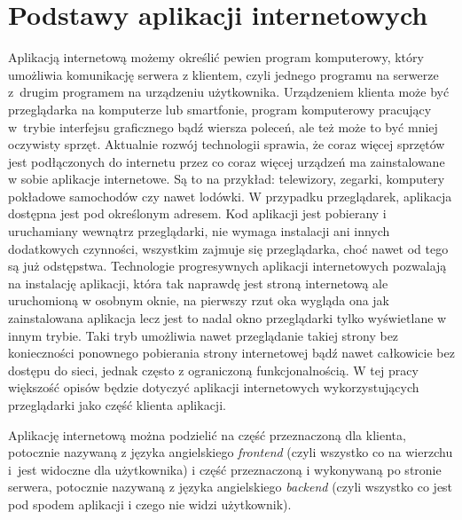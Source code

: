 \documentclass[12pt,a4paper,oneside]{book}
\begin{document}

\chapter{Podstawy aplikacji internetowych}\label{ch_1}

Aplikacją internetową możemy określić pewien program komputerowy, który umożliwia komunikację serwera z klientem, czyli jednego programu na serwerze z~drugim programem na urządzeniu użytkownika. Urządzeniem klienta może być przeglądarka na komputerze lub smartfonie, program komputerowy pracujący w~trybie interfejsu graficznego bądź wiersza poleceń, ale też może to być mniej oczywisty sprzęt. Aktualnie rozwój technologii sprawia, że coraz więcej sprzętów jest podłączonych do internetu przez co coraz więcej urządzeń ma zainstalowane w sobie aplikacje internetowe. Są to na przykład: telewizory, zegarki, komputery pokładowe samochodów czy nawet lodówki. W przypadku przeglądarek, aplikacja dostępna jest pod określonym adresem. Kod aplikacji jest pobierany i uruchamiany wewnątrz przeglądarki, nie wymaga instalacji ani innych dodatkowych czynności, wszystkim zajmuje się przeglądarka, choć nawet od tego są już odstępstwa. Technologie progresywnych aplikacji internetowych pozwalają na instalację aplikacji, która tak naprawdę jest stroną internetową ale uruchomioną w osobnym oknie, na pierwszy rzut oka wygląda ona jak zainstalowana aplikacja lecz jest to nadal okno przeglądarki tylko wyświetlane w innym trybie. Taki tryb umożliwia nawet przeglądanie takiej strony bez konieczności ponownego pobierania strony internetowej bądź nawet całkowicie bez dostępu do sieci, jednak często z ograniczoną funkcjonalnością. W tej pracy większość opisów będzie dotyczyć aplikacji internetowych wykorzystujących przeglądarki jako część klienta aplikacji.

Aplikację internetową można podzielić na część przeznaczoną dla klienta, potocznie nazywaną z języka angielskiego \textit{frontend} (czyli wszystko co na wierzchu i~jest widoczne dla użytkownika) i część przeznaczoną i wykonywaną po stronie serwera, potocznie nazywaną z języka angielskiego \textit{backend} (czyli wszystko co jest pod spodem aplikacji i czego nie widzi użytkownik).
\end{document}
